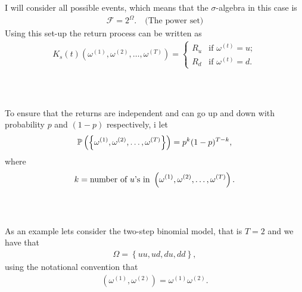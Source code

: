 \documentclass{beamer}
\numberwithin{equation}{section}
\begin{document}
\begin{frame}\frametitle{{\normalsize \secname} \\ {\large \subsecname}}
    I will consider all possible events, which means that the $\sigma$-algebra in this case is
    \begin{align}
        \mathscr{F} = 2^{\Omega}. \quad \text{(The power set)}
    \end{align}
    Using this set-up the return process can be written as
    \begin{align}
        K_s(t)(\omega^{(1)}, \omega^{(2)}, \ldots, \omega^{(T)}) =
        \begin{cases}
            R_u & \text{if } \omega^{(t)} = u; \\
            R_d & \text{if } \omega^{(t)} = d. 
        \end{cases}
    \end{align}
\end{frame}

\begin{frame}\frametitle{{\normalsize \secname} \\ {\large \subsecname}}
    To ensure that the returns are independent and can go up and down with probability $p$ and $(1-p)$ respectively, i let
    \begin{align}
        \mathbb{P}\left(
            \left\{
                \omega^{(1)}, \omega^{(2)}, \ldots, \omega^{{\color{black}(T)}}
            \right\}
        \right) =
        p^k(1 - p)^{T-k},
    \end{align}
    where
    \begin{align}
        k = \text{number of $u$'s in } \left(\omega^{(1)}, \omega^{(2)}, \ldots, \omega^{{\color{black}(T)}}\right). 
    \end{align} 
\end{frame}

\begin{frame}\frametitle{{\normalsize \secname} \\ {\large \subsecname}}
    As an example lets consider the two-step binomial model, that is $T = 2$ and we have that
    \begin{align}
        \Omega = \left\{ uu, ud, du, dd \right\},
    \end{align}
    using the notational convention that
    \begin{align}
        \left(
            \omega^{(1)}, \omega^{(2)}
        \right)
        =
        \omega^{(1)}\omega^{(2)}.
    \end{align}
\end{frame}
\end{document}
